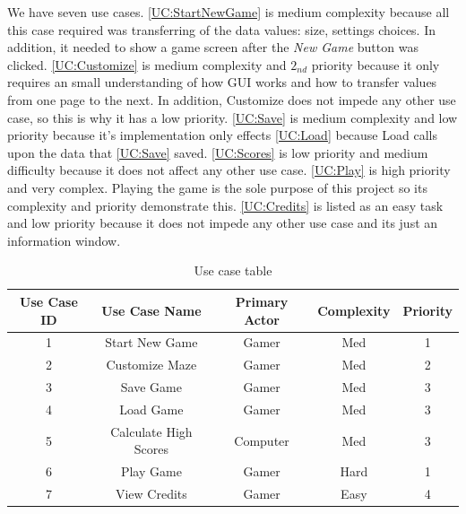 \documentclass[10pt,conference,onecolumn,compsoc]{IEEEtran}
\begin{document}
We have seven use cases. \ref{UC:StartNewGame} is medium complexity because all this case required was transferring of the data values: size, settings choices. In addition, it needed to show a game screen after the \textit{New Game} button was clicked. \ref{UC:Customize} is medium complexity and $2_{nd}$ priority because it only requires an small understanding of how GUI works and how to transfer values from one page to the next. In addition, Customize does not impede any other use case, so this is why it has a low priority. \ref{UC:Save} is medium complexity and low priority because it's implementation only effects \ref{UC:Load} because Load calls upon the data that \ref{UC:Save} saved. \ref{UC:Scores} is low priority and medium difficulty because it does not affect any other use case. \ref{UC:Play} is high priority and very complex. Playing the game is the sole purpose of this project so its complexity and priority demonstrate this. \ref{UC:Credits} is listed as an easy task and low priority because it does not impede any other use case and its just an information window. 

\begin{table}
\centering
\begin{tabular}{|c|c|c|c|c|}
\hline
Use Case ID & Use Case Name & Primary Actor & Complexity & Priority \\
\hline \hline
1\label{UC:StartNewGame} & Start New Game & Gamer & Med & 1\\
2\label{UC:Customize} & Customize Maze & Gamer & Med & 2\\
3\label{UC:Save} & Save Game & Gamer & Med & 3\\
4\label{UC:Load} & Load Game & Gamer & Med  &3\\
5\label{UC:Scores}  & Calculate High Scores & Computer & Med & 3\\
6\label{UC:Play}  & Play Game & Gamer & Hard & 1\\
7\label{UC:Credits} & View Credits & Gamer & Easy & 4\\
\hline

\end{tabular}
\caption{Use case table}
\label{tab:useCaseIndex}
\end{table}
\end{document}
